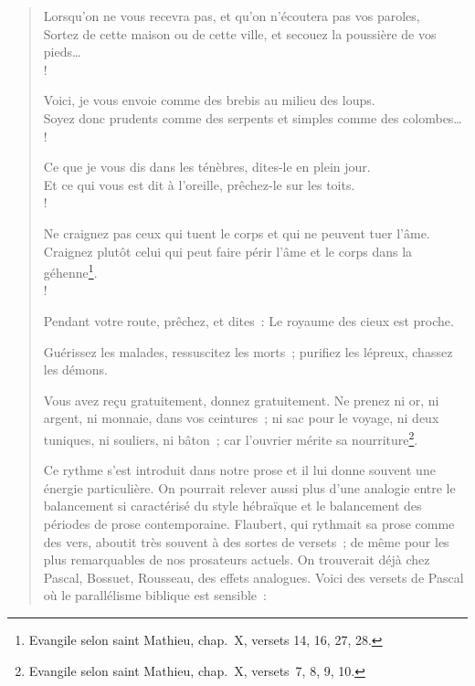 \documentclass[french,twoside]{book} %
\newenvironment{quoteblock}%
  {\begin{quoting}}
  {\end{quoting}}
\newenvironment{quotebar}{%
    \def\FrameCommand{{\color{rubric!10!}\vrule width 0.5em} \hspace{0.9em}}%
    \def\OuterFrameSep{\itemsep} %
    \MakeFramed {\advance\hsize-\width \FrameRestore}
  }%
  {%
    \endMakeFramed
  }
\renewenvironment{quoteblock}%
  {%
    \savenotes
    \setstretch{0.9}
    \normalfont
    \begin{quotebar}
  }
  {%
    \end{quotebar}
    \spewnotes
  }
\begin{document}
\begin{verse}
Lorsqu’on ne vous recevra pas, et qu’on n’écoutera pas vos paroles,\\
Sortez de cette maison ou de cette ville, et secouez la poussière de vos pieds…\\!

Voici, je vous envoie comme des brebis au milieu des loups.\\
Soyez donc prudents comme des serpents et simples comme des colombes…\\!

Ce que je vous dis dans les ténèbres, dites-le en plein jour.\\
Et ce qui vous est dit à l’oreille, prêchez-le sur les toits.\\!

Ne craignez pas ceux qui tuent le corps et qui ne peuvent tuer l’âme.\\
Craignez plutôt celui qui peut faire périr l’âme et le corps dans la géhenne\footnote{Evangile selon saint Mathieu, chap. X, versets 14, 16, 27, 28.}.\\!

\begin{quoteblock}
\noindent Pendant votre route, prêchez, et dites : Le royaume des cieux est proche.\par
Guérissez les malades, ressuscitez les morts ; purifiez les lépreux, chassez les démons.\par
Vous avez reçu gratuitement, donnez gratuitement. Ne prenez ni or, ni argent, ni monnaie, dans vos ceintures ; ni sac pour le voyage, ni deux tuniques, ni souliers, ni bâton ; car l’ouvrier mérite sa nourriture\footnote{Evangile selon saint Mathieu, chap. X, versets 7, 8, 9, 10.}.
\end{quoteblock}

\noindent Ce rythme s’est introduit dans notre prose et il lui donne souvent une énergie particulière. On pourrait relever aussi plus d’une analogie entre le balancement si caractérisé du style hébraïque et le balancement des périodes de prose contemporaine. Flaubert, qui rythmait sa prose comme des vers, aboutit très souvent à des sortes de versets ; de même pour les plus remarquables de nos prosateurs actuels. On trouverait déjà chez Pascal, Bossuet, Rousseau, des effets analogues. Voici des versets de Pascal où le parallélisme biblique est sensible :\par



\end{verse}
\end{document}
